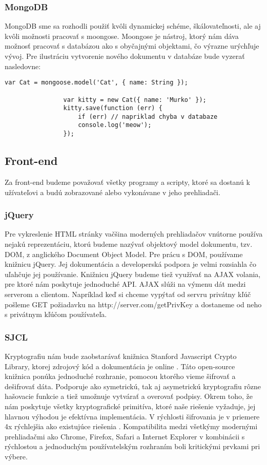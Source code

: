 		\subsubsection{MongoDB}
			MongoDB sme sa rozhodli použiť kvôli dynamickej schéme, škálovateľnosti, ale aj kvôli možnosti pracovať s moongose. Moongose je nástroj, ktorý nám dáva možnosť pracovať s databázou ako s obyčajnými objektami, čo výrazne urýchľuje vývoj. Pre ilustráciu vytvorenie nového dokumentu v databáze bude vyzerať nasledovne:
			\medskip
			\begin{lstlisting}[caption=Vytvorenie mongoose modelu a jeho použitie]
				var Cat = mongoose.model('Cat', { name: String }); 

				var kitty = new Cat({ name: 'Murko' });
				kitty.save(function (err) {
 					if (err) // napriklad chyba v databaze
					console.log('meow');
				});			
			\end{lstlisting}
			
		
	\subsection{Front-end}
		Za front-end budeme považovať všetky programy a scripty, ktoré sa dostanú k užívateľovi a budú zobrazované alebo vykonávane v jeho prehliadači. 
		\subsubsection{jQuery}
			Pre vykreslenie HTML stránky vačšina moderných prehliadačov vnútorne používa nejakú reprezentáciu, ktorú budeme nazývať objektový model dokumentu, tzv. DOM, z anglického Document Object Model. Pre prácu s DOM, používame knižnicu jQuery. Jej dokumentácia a developerská podpora je velmi rozsiahla čo uľahčuje jej používanie. Knižnicu jQuery budeme tiež využívať na AJAX volania, pre ktoré nám poskytuje jednoduché API. AJAX slúži na výmenu dát medzi serverom a clientom. Napríklad keď si chceme vypýtať od servru privátny kľúč pošleme GET požiadavku na http://server.com/getPrivKey a dostaneme od neho s privátnym kľúčom používateľa.
		\subsubsection{SJCL}
		Kryptografiu nám bude zaobstarávať knižnica Stanford Javascript Crypto Library, ktorej zdrojový kód a dokumentácia je online \cite{SJCLgit}. Táto open-source knižnica ponúka jednoduché rozhranie, pomocou ktorého vieme šifrovať a dešifrovať dáta. Podporuje ako symetrickú, tak aj asymetrickú kryptografiu rôzne hašovacie funkcie a tiež umožnuje vytvárať a overovať podpisy. Okrem toho, že nám poskytuje všetky kryptografické primitíva, ktoré naše riešenie vyžaduje, jej hlavnou výhodou je efektívna implementácia. V rýchlosti šifrovania je v priemere 4x rýchlejšia ako existujúce riešenia \cite{SJCLtext}. Kompatibilita medzi všetkýmy modernými prehliadačmi ako Chrome, Firefox, Safari a Internet Explorer v kombinácii s rýchlostou a jednoduchým používatelským rozhraním boli kritickými prvkami pri výbere.



